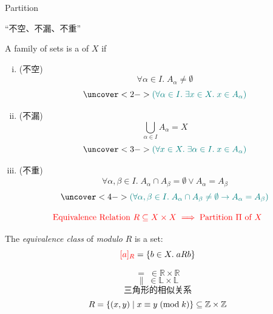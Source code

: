 \begin{frame}{}
  \centerline{\LARGE Partition}

  \vspace{0.60cm}

  \begin{center}
    ``不空、不漏、不重''
  \end{center}
\end{frame}

\begin{frame}{}
  \begin{definition}[划分 (Partition)]
    A family of sets 
    is a  of $X$ if

    \begin{enumerate}[(i)]
      \item (不空)
        \[
          \forall \alpha \in I.\; A_{\alpha} \neq \emptyset
        \]
        \[
          \uncover<2->{\teal{(\forall \alpha \in I.\; \exists x \in X.\; x \in A_{\alpha})}}
        \]
      \item (不漏)
        \[
          \bigcup_{\alpha \in I} A_{\alpha} = X
        \]
        \[
          \uncover<3->{\teal{(\forall x \in X.\; \exists \alpha \in I.\; x \in A_{\alpha})}}
        \]
      \item (不重)
        \[
          \forall \alpha, \beta \in I.\; A_{\alpha} \cap A_{\beta} = \emptyset \lor A_{\alpha} = A_{\beta}
        \]
        \[
          \uncover<4->{\teal{(\forall \alpha, \beta \in I.\; A_{\alpha} \cap A_{\beta} \neq \emptyset \to A_{\alpha} = A_{\beta})}}
        \]
    \end{enumerate}
  \end{definition}
\end{frame}

\begin{frame}{}
  \[
    \textcolor{red}{\text{Equivalence Relation } R \subseteq X \times X \implies \text{Partition } \Pi \text{ of } X}
  \]

  \pause
  \begin{definition}
    The {\it equivalence class} of  {\it modulo} $R$ is a set:
    \[
      \textcolor{red}{[a]_{R}} = \{b \in X.\; a R b\}
    \]
  \end{definition}
  \pause
  \[
    =\; \in \mathbb{R} \times \mathbb{R}
  \]
  \pause
  \[
    \parallel\; \in \mathbb{L} \times \mathbb{L}
  \]
  \pause
  \[
    \text{三角形的相似关系}
  \]
  \pause
  \[
    R = \{(x, y) \mid x \equiv y \;(\text{mod}\; k)\}
      \subseteq \mathbb{Z} \times \mathbb{Z}
  \]
\end{frame}

